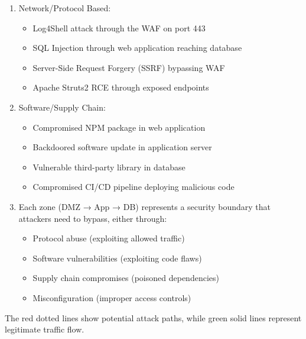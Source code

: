 \begin{enumerate}
    \item Network/Protocol Based:
    \begin{itemize}
        \tightlist
	    \item Log4Shell attack through the WAF on port 443
	    \item SQL Injection through web application reaching database
	    \item Server-Side Request Forgery (SSRF) bypassing WAF
	    \item Apache Struts2 RCE through exposed endpoints
    \end{itemize}

    \item Software/Supply Chain:
    \begin{itemize}
        \tightlist
    	\item Compromised NPM package in web application
    	\item Backdoored software update in application server
    	\item Vulnerable third-party library in database
    	\item Compromised CI/CD pipeline deploying malicious code
    \end{itemize}

    \item Each zone (DMZ → App → DB) represents a security boundary that attackers need to bypass, either through:
    \begin{itemize}
        \tightlist
    	\item Protocol abuse (exploiting allowed traffic)
    	\item Software vulnerabilities (exploiting code flaws)
    	\item Supply chain compromises (poisoned dependencies)
    	\item Misconfiguration (improper access controls)
    \end{itemize}
\end{enumerate}

The red dotted lines show potential attack paths, while green solid lines represent legitimate traffic flow.

